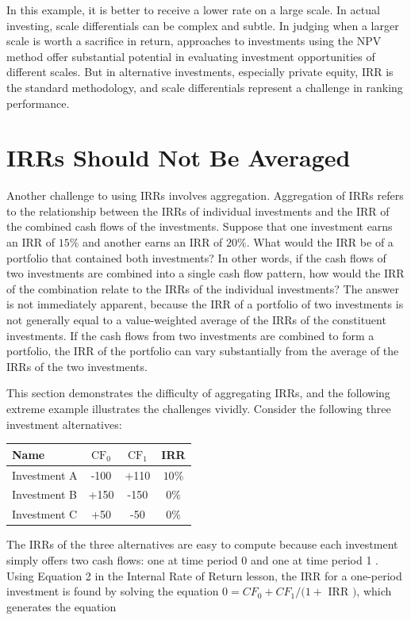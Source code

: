 \documentclass[11pt]{article}
\begin{document}
In this example, it is better to receive a lower rate on a large scale. In actual investing, scale differentials can be complex and subtle. In judging when a larger scale is worth a sacrifice in return, approaches to investments using the NPV method offer substantial potential in evaluating investment opportunities of different scales. But in alternative investments, especially private equity, IRR is the standard methodology, and scale differentials represent a challenge in ranking performance.

\section*{IRRs Should Not Be Averaged}
Another challenge to using IRRs involves aggregation. Aggregation of IRRs refers to the relationship between the IRRs of individual investments and the IRR of the combined cash flows of the investments. Suppose that one investment earns an IRR of $15 \%$ and another earns an IRR of $20 \%$. What would the IRR be of a portfolio that contained both investments? In other words, if the cash flows of two investments are combined into a single cash flow pattern, how would the IRR of the combination relate to the IRRs of the individual investments? The answer is not immediately apparent, because the IRR of a portfolio of two investments is not generally equal to a value-weighted average of the IRRs of the constituent investments. If the cash flows from two investments are combined to form a portfolio, the IRR of the portfolio can vary substantially from the average of the IRRs of the two investments.

This section demonstrates the difficulty of aggregating IRRs, and the following extreme example illustrates the challenges vividly. Consider the following three investment alternatives:

\begin{center}
\begin{tabular}{|lccc|}
\hline
Name & $\mathrm{CF}_{0}$ & $\mathrm{CF}_{1}$ & IRR \\
\hline
Investment A & -100 & +110 & $10 \%$ \\
Investment B & +150 & -150 & $0 \%$ \\
Investment C & +50 & -50 & $0 \%$ \\
\hline
\end{tabular}
\end{center}

The IRRs of the three alternatives are easy to compute because each investment simply offers two cash flows: one at time period 0 and one at time period 1 . Using Equation 2 in the Internal Rate of Return lesson, the IRR for a one-period investment is found by solving the equation $0=C F_{0}+C F_{1} /(1+$ IRR $)$, which generates the equation
\end{document}
